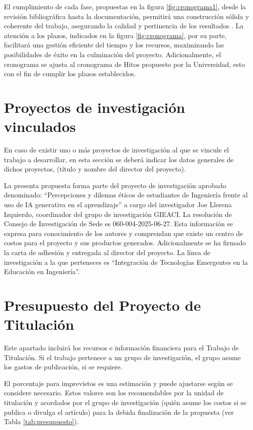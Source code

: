 \documentclass[12pt]{article}
\begin{document}
El cumplimiento de cada fase, propuestas en la figura \ref{fig:cronograma1}, desde la revisión bibliográfica hasta la documentación, permitirá una construcción sólida y coherente del trabajo, asegurando la calidad y pertinencia de los resultados \parencite{sumba2021reflections}. La atención a los plazos, indicados en la figura \ref{fig:cronograma}, por su parte, facilitará una gestión eficiente del tiempo y los recursos, maximizando las posibilidades de éxito en la culminación del proyecto.
Adicionalmente, el cronograma se ajusta al cronograma de Hitos propuesto por la Universidad, esto con el fin de cumplir los plazos establecidos.

\section{Proyectos de investigación vinculados}
{\color{magenta}En caso de existir uno o más proyectos de investigación al que se vincule el trabajo a desarrollar, en esta sección se deberá indicar los datos generales de dichos proyectos, (título y nombre del director del proyecto).}

La presenta propuesta forma parte del proyecto de investigación aprobado denominado: ``Percepciones y dilemas éticos de estudiantes de Ingeniería frente al uso de IA generativa en el aprendizaje'' a cargo del investigador Joe Llerena Izquierdo, coordinador del grupo de investigación GIEACI. La resolución de Consejo de Investigación de Sede es 060-004-2025-06-27. Esta información se expresa para conocimiento de los autores y comprendan que existe un centro de costos para el proyecto y sus productos generados. Adicionalmente se ha firmado la carta de adhesión y entregada al director del proyecto. La línea de investigación a la que perteneces es ``Integración de Tecnologías Emergentes en la Educación en Ingeniería''.

\section{Presupuesto del Proyecto de Titulación}
{\color{magenta}Este apartado incluirá los recursos e información financiera para el Trabajo de Titulación. Si el trabajo pertenece a un grupo de investigación, el grupo asume los gastos de publicación, si se requiere.}

El porcentaje para imprevistos es una estimación y puede ajustarse según se considere necesario. Estos valores son los recomendables por la unidad de titulación y acordados por el grupo de investigación (quién asume los costos si se publica o divulga el artículo) para la debida finalización de la propuesta (ver Tabla \ref{tab:presupuesto}).
\end{document}
